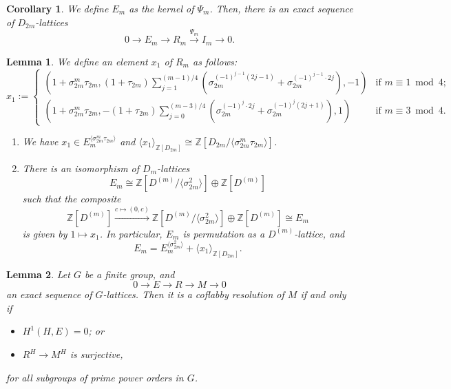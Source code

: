 \documentclass[10pt,a4paper]{amsart}
\newtheorem{lem}{Lemma}
\newtheorem{cor}{Corollary}
\newcommand{\Z}{\mathbb{Z}}
\begin{document}
\begin{cor}\label{cor:eris}
We define $E_{m}$ as the kernel of $\Psi_{m}$. Then, there is an exact sequence of $D_{2m}$-lattices
\begin{equation}\label{eq:cdcf}
0\rightarrow E_{m} \rightarrow R_{m} \xrightarrow{\Psi_{m}} I_{m} \rightarrow 0. 
\end{equation}
\end{cor}

\begin{lem}\label{lem:rsdg}
We define an element $x_{1}$ of $R_{m}$ as follows: 
\begin{equation*}
x_{1}:=
\begin{cases}
\left(1+\sigma_{2m}^{m}\tau_{2m},(1+\tau_{2m})\sum_{j=1}^{(m-1)/4}(\sigma_{2m}^{(-1)^{j-1}(2j-1)}+\sigma_{2m}^{(-1)^{j-1}\cdot 2j}),-1\right)&\text{if }m\equiv 1\bmod 4;\\
\left(1+\sigma_{2m}^{m}\tau_{2m},-(1+\tau_{2m})\sum_{j=0}^{(m-3)/4}(\sigma_{2m}^{(-1)^{j}\cdot 2j}+\sigma_{2m}^{(-1)^{j}(2j+1)}),1\right)&\text{if }m\equiv 3\bmod 4. 
\end{cases}
\end{equation*}
\begin{enumerate}
\item We have $x_{1}\in E_{m}^{\langle \sigma_{2m}^{m}\tau_{2m} \rangle}$ and $\langle x_{1}\rangle_{\Z[D_{2m}]}\cong \Z[D_{2m}/\langle \sigma_{2m}^{m}\tau_{2m} \rangle]$. 
\item There is an isomorphism of $D_{m}$-lattices
\begin{equation*}
E_{m}\cong \Z[D^{(m)}/\langle \sigma_{2m}^{2}\rangle]\oplus \Z[D^{(m)}]
\end{equation*}
such that the composite
\begin{equation*}
\Z[D^{(m)}]\xrightarrow{c\mapsto (0,c)} \Z[D^{(m)}/\langle \sigma_{2m}^{2}\rangle]\oplus \Z[D^{(m)}]\cong E_{m}
\end{equation*}
is given by $1\mapsto x_{1}$. In particular, $E_{m}$ is permutation as a $D^{(m)}$-lattice, and 
\begin{equation*}
E_{m}=E_{m}^{\langle \sigma_{2m}^{2}\rangle}+\langle x_{1}\rangle_{\Z[D_{2m}]}. 
\end{equation*}
\end{enumerate}
\end{lem}

\begin{lem}\label{lem:flpp}
Let $G$ be a finite group, and
\begin{equation}\label{eq:abcf}
0\rightarrow E \rightarrow R \rightarrow M \rightarrow 0
\end{equation}
an exact sequence of $G$-lattices. Then it is a coflabby resolution of $M$ if and only if 
\begin{itemize}
    \item[(a)] $H^{1}(H,E)=0$; or
    \item[(b)] $R^{H}\rightarrow M^{H}$ is surjective,
\end{itemize}
for all subgroups of prime power orders in $G$. 
\end{lem}
\end{document}
